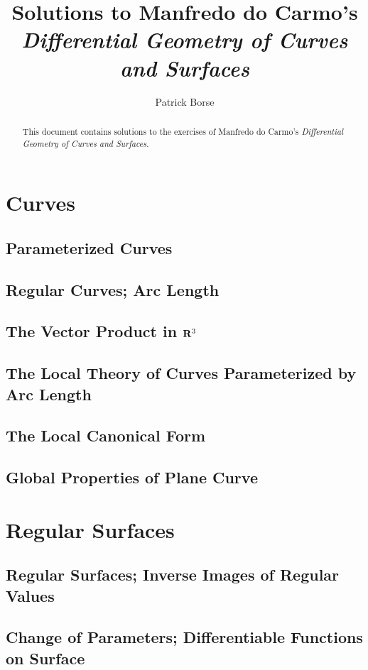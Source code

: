 \documentclass[oneside]{amsbook}
\title{Solutions to Manfredo do Carmo's\\ \emph{Differential Geometry of Curves and Surfaces}}
\author{Patrick Borse}
\numberwithin{ex}{section}
\begin{document}
\begin{abstract}
This document contains solutions to the exercises of Manfredo do Carmo's \emph{Differential Geometry of Curves and Surfaces}.
\end{abstract}

\maketitle

\tableofcontents

\chapter{Curves}
\setcounter{section}{1}
\section{Parameterized Curves}

\section{Regular Curves; Arc Length}

\section{The Vector Product in $\mathbf{R}^3$}

\section{The Local Theory of Curves Parameterized by Arc Length}

\section{The Local Canonical Form}

\section{Global Properties of Plane Curve}


\chapter{Regular Surfaces}
\setcounter{section}{1}
\section{Regular Surfaces; Inverse Images of Regular Values}

\section{Change of Parameters; Differentiable Functions on Surface}

\end{document}
